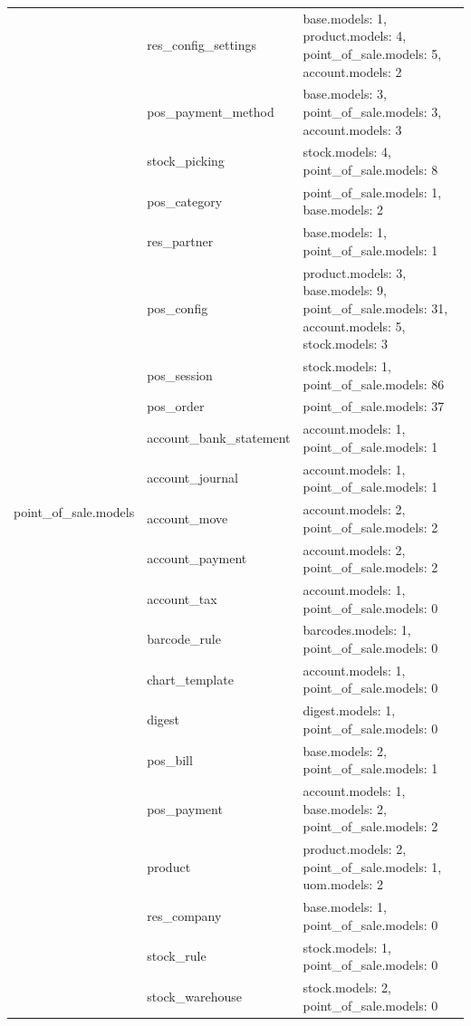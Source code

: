 \begin{longtable}{|c|p{4cm}|p{7cm}|}
	\hline
\multirow{22}{*}{point{\_}of{\_}sale.models} &  res{\_}config{\_}settings &  base.models: 1, product.models: 4, point{\_}of{\_}sale.models: 5, account.models: 2 \\ \cline{2-3}  &  pos{\_}payment{\_}method &  base.models: 3, point{\_}of{\_}sale.models: 3, account.models: 3 \\ \cline{2-3}  &  stock{\_}picking &  stock.models: 4, point{\_}of{\_}sale.models: 8 \\ \cline{2-3}  &  pos{\_}category &  point{\_}of{\_}sale.models: 1, base.models: 2 \\ \cline{2-3}  &  res{\_}partner &  base.models: 1, point{\_}of{\_}sale.models: 1 \\ \cline{2-3}  &  pos{\_}config &  product.models: 3, base.models: 9, point{\_}of{\_}sale.models: 31, account.models: 5, stock.models: 3 \\ \cline{2-3}  &  pos{\_}session &  stock.models: 1, point{\_}of{\_}sale.models: 86 \\ \cline{2-3}  &  pos{\_}order &  point{\_}of{\_}sale.models: 37 \\ \cline{2-3}  &  account{\_}bank{\_}statement &  account.models: 1, point{\_}of{\_}sale.models: 1 \\ \cline{2-3}  &  account{\_}journal &  account.models: 1, point{\_}of{\_}sale.models: 1 \\ \cline{2-3}  &  account{\_}move &  account.models: 2, point{\_}of{\_}sale.models: 2 \\ \cline{2-3}  &  account{\_}payment &  account.models: 2, point{\_}of{\_}sale.models: 2 \\ \cline{2-3}  &  account{\_}tax &  account.models: 1, point{\_}of{\_}sale.models: 0 \\ \cline{2-3}  &  barcode{\_}rule &  barcodes.models: 1, point{\_}of{\_}sale.models: 0 \\ \cline{2-3}  &  chart{\_}template &  account.models: 1, point{\_}of{\_}sale.models: 0 \\ \cline{2-3}  &  digest &  digest.models: 1, point{\_}of{\_}sale.models: 0 \\ \cline{2-3}  &  pos{\_}bill &  base.models: 2, point{\_}of{\_}sale.models: 1 \\ \cline{2-3}  &  pos{\_}payment &  account.models: 1, base.models: 2, point{\_}of{\_}sale.models: 2 \\ \cline{2-3}  &  product &  product.models: 2, point{\_}of{\_}sale.models: 1, uom.models: 2 \\ \cline{2-3}  &  res{\_}company &  base.models: 1, point{\_}of{\_}sale.models: 0 \\ \cline{2-3}  &  stock{\_}rule &  stock.models: 1, point{\_}of{\_}sale.models: 0 \\ \cline{2-3}  &  stock{\_}warehouse &  stock.models: 2, point{\_}of{\_}sale.models: 0 \\


\end{longtable}
